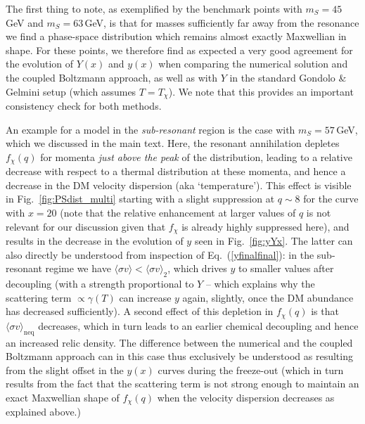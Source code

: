 \documentclass[twocolumn,showpacs,amsmath,amssymb,superscriptaddress,nofootinbib]{revtex4-1}
\begin{document}
The first thing to note, as exemplified by the benchmark points with $m_S=45$\,GeV and 
$m_S=63$\,GeV, is that for masses sufficiently far away from the resonance we find a 
phase-space distribution which remains almost exactly Maxwellian in shape. %
For these points, we therefore find as expected a very good agreement 
for the evolution of $Y(x)$ and $y(x)$ when comparing the numerical solution and the 
coupled Boltzmann approach, as well as with $Y$ in the standard Gondolo \& Gelmini setup 
(which assumes $T=T_\chi$). 
We note that this provides an important consistency check for both methods.

An example for a model in the {\it sub-resonant} region is the case with $m_S=57$\,GeV, which we
discussed in the main text. Here, the resonant annihilation depletes  $f_\chi(q)$ %
for momenta {\it just above the peak} of the distribution, leading to a relative decrease with respect
to a thermal distribution at these momenta, and hence a decrease in the DM velocity
dispersion (aka `temperature'). This effect is visible in Fig.~\ref{fig:PSdist_multi} starting with
a slight suppression at $q\sim8$ for the curve with $x=20$ 
(note that the relative enhancement 
at larger values of $q$ is not relevant  for our discussion given that $f_\chi$ is already highly 
suppressed here), and results in the decrease in the evolution of $y$ seen in Fig.~\ref{fig:yYx}. The latter
can also directly be understood from inspection of Eq.~(\ref{yfinalfinal}): in the sub-resonant 
regime we have $\langle \sigma v\rangle<\langle \sigma v\rangle_2$, which drives $y$ to smaller
values after decoupling (with a strength proportional to $Y$ -- which explains why the scattering term 
$\propto\gamma(T)$ can increase $y$ again, slightly,  once the DM abundance has decreased sufficiently).
A second effect of this depletion in $f_\chi(q)$ 
is that $\langle \sigma v\rangle_\mathrm{neq}$ 
decreases, which in turn leads to an earlier chemical decoupling and hence an increased relic 
density. 
The difference between the numerical and the coupled Boltzmann approach 
can in this case thus exclusively be understood as resulting from the slight offset in the 
$y(x)$ curves during the freeze-out
(which in turn results from the fact that the scattering term is not strong enough to maintain 
an exact Maxwellian shape of $f_\chi(q)$  when the velocity dispersion decreases as explained above.)
\end{document}
